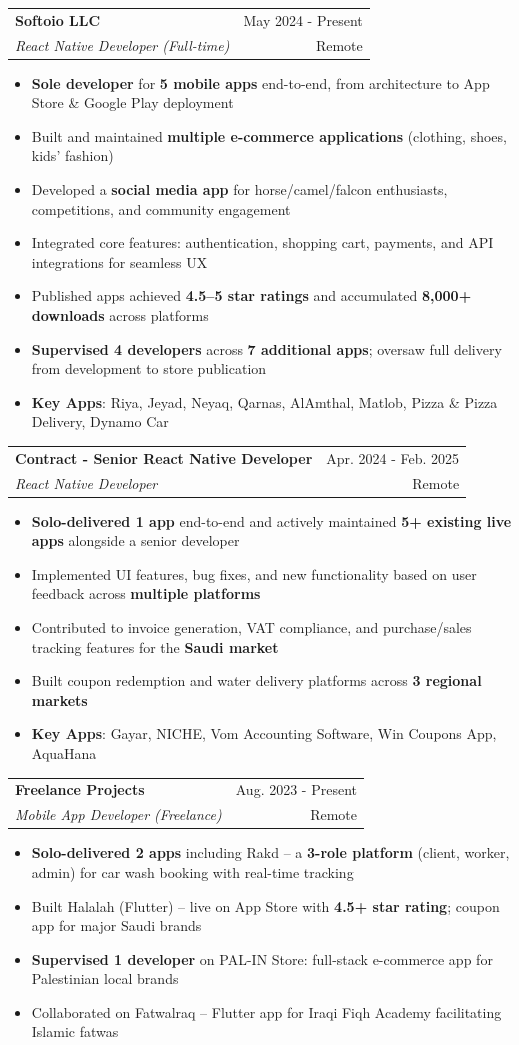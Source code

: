 \documentclass[letterpaper,11pt]{article}
\makeatletter
\newcommand{\resumeItem}[1]{
  \item\small{
    {#1 \vspace{-1pt}}
  }
}
\newcommand{\resumeSubheading}[4]{
  \vspace{-1pt}\item
    \begin{tabular*}{\textwidth}[t]{l@{\extracolsep{\fill}}r}
      \textbf{#1} & {\color{dark-grey}\small #2}\vspace{1pt}\\ %
      \textit{#3} & {\color{dark-grey} \small #4}\\ %
    \end{tabular*}\vspace{-4pt}
}
\newcommand{\resumeItemListStart}{\begin{itemize}}
\newcommand{\resumeItemListEnd}{\end{itemize}\vspace{0pt}}
\makeatother
\begin{document}
    \resumeSubheading
      {Softoio LLC}{May 2024 - Present}
      {React Native Developer (Full-time)}{Remote}
      \resumeItemListStart
        \resumeItem{\textbf{Sole developer} for \textbf{5 mobile apps} end-to-end, from architecture to App Store \& Google Play deployment}
        \resumeItem{Built and maintained \textbf{multiple e-commerce applications} (clothing, shoes, kids' fashion)}
        \resumeItem{Developed a \textbf{social media app} for horse/camel/falcon enthusiasts, competitions, and community engagement}
        \resumeItem{Integrated core features: authentication, shopping cart, payments, and API integrations for seamless UX}
        \resumeItem{Published apps achieved \textbf{4.5--5 star ratings} and accumulated \textbf{8,000+ downloads} across platforms}
        \resumeItem{\textbf{Supervised 4 developers} across \textbf{7 additional apps}; oversaw full delivery from development to store publication}
        \resumeItem{\textbf{Key Apps}: Riya, Jeyad, Neyaq, Qarnas, AlAmthal, Matlob, Pizza \& Pizza Delivery, Dynamo Car}
      \resumeItemListEnd

    \resumeSubheading
      {Contract - Senior React Native Developer}{Apr. 2024 - Feb. 2025}
      {React Native Developer}{Remote}
      \resumeItemListStart
        \resumeItem{\textbf{Solo-delivered 1 app} end-to-end and actively maintained \textbf{5+ existing live apps} alongside a senior developer}
        \resumeItem{Implemented UI features, bug fixes, and new functionality based on user feedback across \textbf{multiple platforms}}
        \resumeItem{Contributed to invoice generation, VAT compliance, and purchase/sales tracking features for the \textbf{Saudi market}}
        \resumeItem{Built coupon redemption and water delivery platforms across \textbf{3 regional markets}}
        \resumeItem{\textbf{Key Apps}: Gayar, NICHE, Vom Accounting Software, Win Coupons App, AquaHana}
      \resumeItemListEnd

    \resumeSubheading
      {Freelance Projects}{Aug. 2023 - Present}
      {Mobile App Developer (Freelance)}{Remote}
      \resumeItemListStart
        \resumeItem{\textbf{Solo-delivered 2 apps} including Rakd -- a \textbf{3-role platform} (client, worker, admin) for car wash booking with real-time tracking}
        \resumeItem{Built Halalah (Flutter) -- live on App Store with \textbf{4.5+ star rating}; coupon app for major Saudi brands}
        \resumeItem{\textbf{Supervised 1 developer} on PAL-IN Store: full-stack e-commerce app for Palestinian local brands}
        \resumeItem{Collaborated on Fatwalraq -- Flutter app for Iraqi Fiqh Academy facilitating Islamic fatwas}
      \resumeItemListEnd
\end{document}

